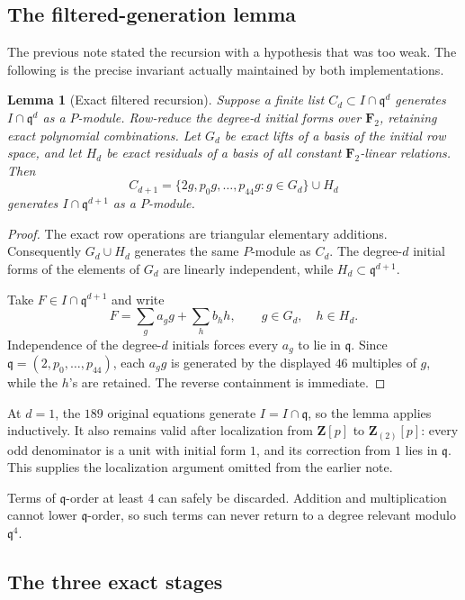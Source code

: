 \documentclass[11pt]{article}
\newtheorem{lemma}[theorem]{Lemma}
\theoremstyle{remark}
\newcommand{\F}{\mathbf F}
\newcommand{\Z}{\mathbf Z}
\newcommand{\q}{\mathfrak q}
\begin{document}
\subsection{The filtered-generation lemma}

The previous note stated the recursion with a hypothesis that was too weak.
The following is the precise invariant actually maintained by both
implementations.

\begin{lemma}[Exact filtered recursion]\label{lem:filtered}
Suppose a finite list \(C_d\subset I\cap\q^d\) generates
\(I\cap\q^d\) as a \(P\)-module.  Row-reduce the degree-\(d\) initial forms
over \(\F_2\), retaining exact polynomial combinations.  Let \(G_d\) be exact
lifts of a basis of the initial row space, and let \(H_d\) be exact residuals
of a basis of all constant \(\F_2\)-linear relations.  Then
\[
 C_{d+1}=
 \{2g,p_0g,\ldots,p_{44}g:g\in G_d\}\cup H_d
\]
generates \(I\cap\q^{d+1}\) as a \(P\)-module.
\end{lemma}

\begin{proof}
The exact row operations are triangular elementary additions.  Consequently
\(G_d\cup H_d\) generates the same \(P\)-module as \(C_d\).  The degree-\(d\)
initial forms of the elements of \(G_d\) are linearly independent, while
\(H_d\subset\q^{d+1}\).

Take \(F\in I\cap\q^{d+1}\) and write
\[
 F=\sum_g a_g g+\sum_h b_h h,
 \qquad g\in G_d,\quad h\in H_d.
\]
Independence of the degree-\(d\) initials forces every \(a_g\) to lie in
\(\q\).  Since \(\q=(2,p_0,\ldots,p_{44})\), each \(a_g g\) is generated by
the displayed \(46\) multiples of \(g\), while the \(h\)'s are retained.
The reverse containment is immediate.
\end{proof}

At \(d=1\), the \(189\) original equations generate \(I=I\cap\q\), so the
lemma applies inductively.  It also remains valid after localization from
\(\Z[p]\) to \(\Z_{(2)}[p]\): every odd denominator is a unit with initial
form \(1\), and its correction from \(1\) lies in \(\q\).  This supplies the
localization argument omitted from the earlier note.

Terms of \(\q\)-order at least \(4\) can safely be discarded.  Addition and
multiplication cannot lower \(\q\)-order, so such terms can never return to a
degree relevant modulo \(\q^4\).

\subsection{The three exact stages}
\end{document}
